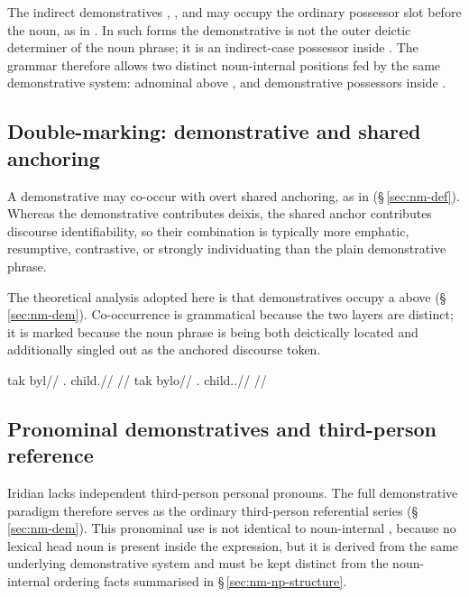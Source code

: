 The indirect demonstratives
, , and  may occupy the ordinary possessor slot
before the noun, as in . In such forms the demonstrative is not the
outer deictic determiner of the noun phrase; it is an indirect-case possessor
inside . The grammar therefore allows two distinct noun-internal
positions fed by the same demonstrative system: adnominal  above
, and demonstrative possessors inside .

\subsection{Double-marking: demonstrative and shared anchoring}
\label{sec:nm-def-double}

A demonstrative may co-occur with overt shared anchoring, as in
 
(§\,\ref{sec:nm-def}). Whereas the demonstrative contributes deixis, the
shared anchor contributes discourse identifiability, so their combination is typically more emphatic,
resumptive, contrastive, or strongly individuating than the plain demonstrative
phrase.

The theoretical analysis adopted here is that demonstratives occupy a
 above  (§\,\ref{sec:nm-dem}). Co-occurrence is
grammatical because the two layers are distinct; it is marked because the noun
phrase is being both deictically located and additionally singled out as the
anchored discourse token.

\pex
\a
\begingl
\gla tak byl//
\glb \Dem{}.\Prox{} child.\Dir{}//
\glft {}//
\endgl
\a
\begingl
\gla tak bylo//
\glb \Dem{}.\Prox{} child.\Dir{}.\Def{}//
\glft {}//
\endgl
\xe

\subsection{Pronominal demonstratives and third-person reference}
\label{sec:nm-dem-pron}

Iridian lacks independent third-person personal pronouns. The full demonstrative
paradigm therefore serves as the ordinary third-person referential series
(§\,\ref{sec:nm-dem}). This pronominal use is not identical to noun-internal
, because no lexical head noun is present inside the expression,
but it is derived from the same underlying demonstrative system and must be kept
distinct from the noun-internal ordering facts summarised in
§\,\ref{sec:nm-np-structure}.


